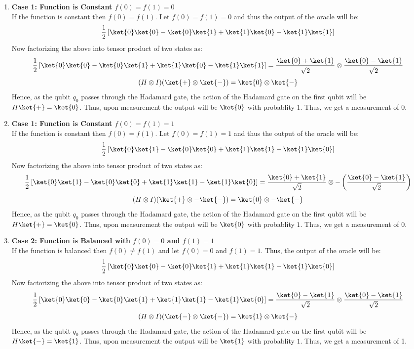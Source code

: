 \documentclass[12pt, oneside]{book}
\theoremstyle{definition}
\theoremstyle{definition}
\theoremstyle{remark}
\begin{document}
\begin{enumerate}
    \item \textbf{Case 1: Function is Constant $f(0)=f(1)=0$}\\
    If the function is constant then $f(0)=f(1)$. Let $f(0)=f(1)=0$ and thus the output of the oracle will be:
    \[
        \frac{1}{2}\left[\ket{0}\ket{0}-\ket{0}\ket{1}+\ket{1}\ket{0}-\ket{1}\ket{1}\right]
    \]
    Now factorizing the above into tensor product of two states as:
    \[
        \frac{1}{2}\left[\ket{0}\ket{0}-\ket{0}\ket{1}+\ket{1}\ket{0}-\ket{1}\ket{1}\right]=\frac{\ket{0}+\ket{1}}{\sqrt{2}}\otimes \frac{\ket{0}-\ket{1}}{\sqrt{2}}
    \]
    \[
        (H\otimes I)(\ket{+} \otimes \ket{-})=\ket{0}\otimes \ket{-}
    \]
    Hence, as the qubit $q_0$ passes through the Hadamard gate, the action of the Hadamard gate on the first qubit will be $H\ket{+}=\ket{0}$. 
    Thus, upon measurement the output will be $\ket{0}$ with probablity $1$. Thus, we get a measurement of 0.
    
    \item \textbf{Case 1: Function is Constant $f(0)=f(1)=1$}\\
    If the function is constant then $f(0)=f(1)$. Let $f(0)=f(1)=1$ and thus the output of the oracle will be:
    \[
        \frac{1}{2}\left[\ket{0}\ket{1}-\ket{0}\ket{0}+\ket{1}\ket{1}-\ket{1}\ket{0}\right]
    \]
    Now factorizing the above into tensor product of two states as:
    \[
        \frac{1}{2}\left[\ket{0}\ket{1}-\ket{0}\ket{0}+\ket{1}\ket{1}-\ket{1}\ket{0}\right]=\frac{\ket{0}+\ket{1}}{\sqrt{2}}\otimes -\left(\frac{\ket{0}-\ket{1}}{\sqrt{2}}\right)
    \]
    \[
        (H\otimes I)(\ket{+} \otimes -\ket{-})=\ket{0}\otimes -\ket{-}
    \]
    Hence, as the qubit $q_0$ passes through the Hadamard gate, the action of the Hadamard gate on the first qubit will be $H\ket{+}=\ket{0}$.
    Thus, upon measurement the output will be $\ket{0}$ with probablity $1$. Thus, we get a measurement of 0.
    
    \item \textbf{Case 2: Function is Balanced with $f(0)=0$ and $f(1)=1$}\\
    If the function is balanced then $f(0)\neq f(1)$ and let $f(0)=0$ and $f(1)=1$. Thus, the output of the oracle will be:
    \[
        \frac{1}{2}\left[\ket{0}\ket{0}-\ket{0}\ket{1}+\ket{1}\ket{1}-\ket{1}\ket{0}\right]
    \]
    Now factorizing the above into tensor product of two states as:
    \[
        \frac{1}{2}\left[\ket{0}\ket{0}-\ket{0}\ket{1}+\ket{1}\ket{1}-\ket{1}\ket{0}\right]=\frac{\ket{0}-\ket{1}}{\sqrt{2}}\otimes \frac{\ket{0}-\ket{1}}{\sqrt{2}}
    \]
    \[
        (H\otimes I)(\ket{-} \otimes \ket{-})=\ket{1}\otimes \ket{-}
    \]
    Hence, as the qubit $q_0$ passes through the Hadamard gate, the action of the Hadamard gate on the first qubit will be $H\ket{-}=\ket{1}$.
    Thus, upon measurement the output will be $\ket{1}$ with probablity $1$. Thus, we get a measurement of 1.


\end{enumerate}
\end{document}

